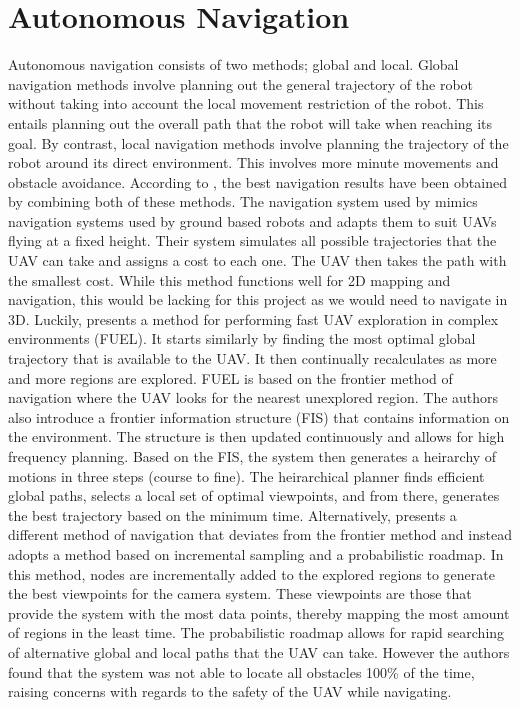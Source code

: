 \documentclass[english]{upeeei}
\begin{document}
\section{Autonomous Navigation}
Autonomous navigation consists of two methods; global and local. Global navigation methods involve planning out the general
trajectory of the robot without taking into account the local movement restriction of the robot. This entails planning out
the overall path that the robot will take when reaching its goal. By contrast, local navigation methods involve planning
the trajectory of the robot around its direct environment. This involves more minute movements and obstacle avoidance. 
According to \cite{Dowling2018}, the best navigation results have been obtained by combining both of these methods. The
navigation system used by \cite{Dowling2018} mimics navigation systems used by ground based robots and adapts them to suit
UAVs flying at a fixed height. Their system simulates all possible trajectories that the UAV can take and assigns a cost
to each one. The UAV then takes the path with the smallest cost. While this method functions well for 2D mapping and
navigation, this would be lacking for this project as we would need to navigate in 3D. Luckily, \cite{Fuel2020} presents
a method for performing fast UAV exploration in complex environments (FUEL). It starts similarly by finding the most optimal
global trajectory that is available to the UAV. It then continually recalculates as more and more regions are explored.
FUEL is based on the frontier method of navigation where the UAV looks for the nearest unexplored region. The authors also
introduce a frontier information structure (FIS) that contains information on the environment. The structure is then updated
continuously and allows for high frequency planning. Based on the FIS, the system then generates a heirarchy of motions
in three steps (course to fine). The heirarchical planner finds efficient global paths, selects a local set of optimal
viewpoints, and from there, generates the best trajectory based on the minimum time. Alternatively, \cite{ProbNav}
presents a different method of navigation that deviates from the frontier method and instead adopts a method based on
incremental sampling and a probabilistic roadmap. In this method, nodes are incrementally added to the explored regions to
generate the best viewpoints for the camera system. These viewpoints are those that provide the system with the most data
points, thereby mapping the most amount of regions in the least time. The probabilistic roadmap allows for rapid searching
of alternative global and local paths that the UAV can take. However the authors found that the system was not able to
locate all obstacles 100\% of the time, raising concerns with regards to the safety of the UAV while navigating.
\end{document}
